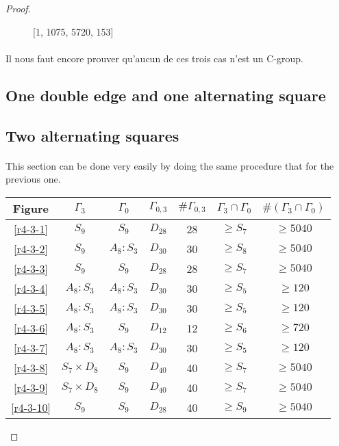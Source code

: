 \begin{proof}
\begin{figure}[H]
\begin{center}
\begin{tikzpicture}
      \end{tikzpicture}
      \caption{[1, 1075, 5720, 153]}
    \end{center}
  \end{figure}

  \paragraph{}
  Il nous faut encore prouver qu'aucun de ces trois cas n'est un C-group.

\subsection{One double edge and one alternating square}

\subsection{Two alternating squares}
  \paragraph{}
  This section can be done very easily by doing the same procedure that for the previous one.

  \begin{table}[H]
    \centering
    \begin{tabular}{|c|c|c|c|c|c|c|}
      \hline
      Figure & $\Gamma_3$ & $\Gamma_0$ & $\Gamma_{0,3}$ & $\#\Gamma_{0,3}$ & $\Gamma_3 \cap \Gamma_0$ & $\#(\Gamma_3 \cap \Gamma_0)$ \\ \hline

      \ref{r4-3-1} & $S_9$ & $S_9$ & $D_{28}$ & 28 & $\ge S_7$ & $\ge 5040$ \\ \hline
      \ref{r4-3-2} & $S_9$ & $A_8 : S_3$ & $D_{30}$ & 30 & $\ge S_8$ & $\ge 5040$  \\ \hline
      \ref{r4-3-3} & $S_9$ & $S_9$ & $D_{28}$ & 28 & $\ge S_7$ & $\ge 5040$ \\ \hline
      \ref{r4-3-4} & $A_8 : S_3$ & $A_8 : S_3$ & $D_{30}$ & 30 & $\ge S_5$ & $\ge 120$ \\ \hline
      \ref{r4-3-5} & $A_8 : S_3$ & $A_8 : S_3$ & $D_{30}$ & 30 & $\ge S_5$ & $\ge 120$ \\ \hline
      \ref{r4-3-6} & $A_8 : S_3$ & $S_9$ & $D_{12}$ & 12 & $\ge S_6$ & $\ge 720$ \\ \hline
      \ref{r4-3-7} & $A_8 : S_3$ & $A_8 : S_3$ & $D_{30}$ & 30 & $\ge S_5$ & $\ge 120$  \\ \hline
      \ref{r4-3-8} & $S_7 \times D_8$ & $S_9$ & $D_{40}$ & 40 & $\ge S_7$ & $\ge 5040$ \\ \hline
      \ref{r4-3-9} & $S_7 \times D_8$ & $S_9$ & $D_{40}$ & 40 & $\ge S_7$ & $\ge 5040$ \\ \hline
      \ref{r4-3-10}& $S_9$ & $S_9$ & $D_{28}$ & 40 & $\ge S_9$ & $\ge 5040$ \\ \hline

    \end{tabular}
  \end{table}

\end{proof}
